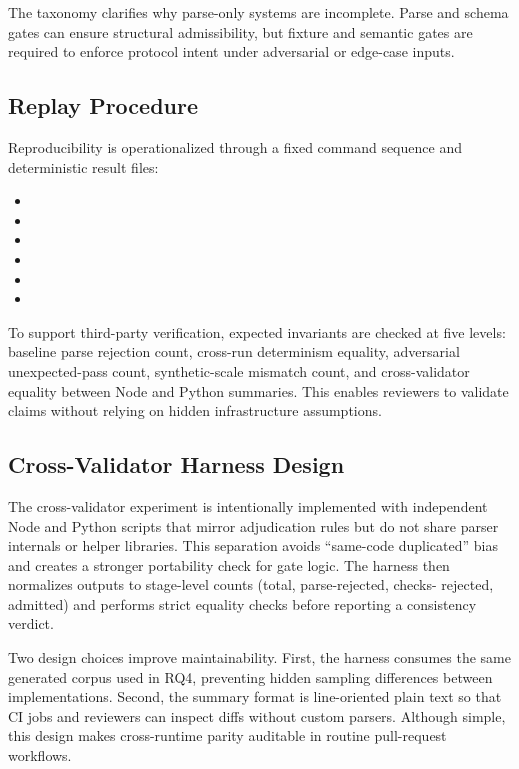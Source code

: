 \documentclass[10pt,conference]{IEEEtran}
\begin{document}
The taxonomy clarifies why parse-only systems are incomplete. Parse and schema
gates can ensure structural admissibility, but fixture and semantic gates are
required to enforce protocol intent under adversarial or edge-case inputs.

\subsection{Replay Procedure}

Reproducibility is operationalized through a fixed command sequence and
deterministic result files:
\begin{itemize}
\item {}
\item {}
\item {}
\item {}
\item {}
\item {}
\end{itemize}

To support third-party verification, expected invariants are checked at five
levels: baseline parse rejection count, cross-run determinism equality,
adversarial unexpected-pass count, synthetic-scale mismatch count, and
cross-validator equality between Node and Python summaries. This enables
reviewers to validate claims without relying on hidden infrastructure
assumptions.

\subsection{Cross-Validator Harness Design}

The cross-validator experiment is intentionally implemented with independent
Node and Python scripts that mirror adjudication rules but do not share parser
internals or helper libraries. This separation avoids ``same-code duplicated''
bias and creates a stronger portability check for gate logic. The harness then
normalizes outputs to stage-level counts (total, parse-rejected, checks-
rejected, admitted) and performs strict equality checks before reporting a
consistency verdict.

Two design choices improve maintainability. First, the harness consumes the
same generated corpus used in RQ4, preventing hidden sampling differences
between implementations. Second, the summary format is line-oriented plain text
so that CI jobs and reviewers can inspect diffs without custom parsers.
Although simple, this design makes cross-runtime parity auditable in routine
pull-request workflows.
\end{document}
